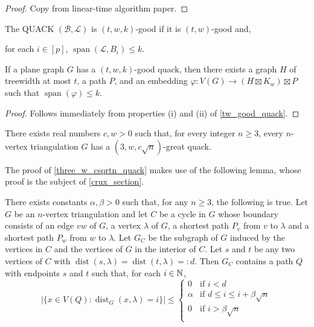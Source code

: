 \documentclass{patmorin}
\newcommand{\defin}[1]{\emph{\textcolor{brightmaroon}{#1}}}
\DeclareMathOperator{\spn}{span}
\DeclareMathOperator{\dist}{dist}
\begin{document}
\begin{proof}
  Copy from linear-time algorithm paper.
\end{proof}

The QUACK $(\mathcal{B},\mathcal{L})$ is $(t,w,k)$-good if it is $(t,w)$-good and,
\begin{compactenum}[({good-}a)]\setcounter{enumi}{18}
  \item for each $i\in[p]$, $\spn(\mathcal{L},B_i)\le k$.
\end{compactenum}

\begin{lem}
  If a plane graph $G$ has a $(t,w,k)$-good quack, then there exists a graph $H$ of treewidth at most $t$, a path $P$, and an embedding $\varphi:V(G)\to (H\boxtimes K_w)\boxtimes P$ such that $\spn(\varphi)\le k$.
\end{lem}

\begin{proof}
  Follows immediately from properties (i) and (ii) of \cref{tw_good_quack}.
\end{proof}






\begin{thm}\label{three_w_csqrtn_quack}
  There exists real numbers $c,w>0$ such that, for every integer $n\ge 3$, every $n$-vertex triangulation $G$ has a $(3,w,c\sqrt{n})$-great quack.
\end{thm}


The proof of \cref{three_w_csqrtn_quack} makes use of the following lemma, whose proof is the subject of \cref{crux_section}.

\begin{lem}\label{awesome_path}
  There exists constants $\alpha,\beta>0$ such that, for any $n\ge 3$, the following is true.
  Let $G$ be an $n$-vertex triangulation and let $C$ be a cycle in $G$ whose boundary consists of an edge $vw$ of $G$, a vertex $\lambda$ of $G$, a shortest path $P_v$ from $v$ to $\lambda$ and a shortest path $P_w$ from $w$ to $\lambda$.  Let $G_C$ be the subgraph of $G$ induced by the vertices in $C$ and the vertices of $G$ in the interior of $C$.  Let $s$ and $t$ be any two vertices of $C$ with $\dist(s,\lambda)=\dist(t,\lambda)=:d$.  Then $G_C$ contains a path $Q$ with endpoints $s$ and $t$ such that, for each $i\in\mathbb{N}$,
    \[  |\{x\in V(Q):\dist_G(x,\lambda)=i\}| \le
      \begin{cases}
        0 & \text{if $i < d$} \\
        \alpha & \text{if $d\le i \le i+\beta\sqrt{n}$} \\
        0 & \text{if $i > \beta\sqrt{n}$} \\
      \end{cases}
    \]
\end{lem}
\end{document}
